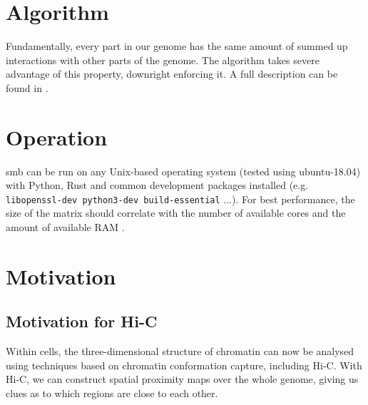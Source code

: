 


\section{Algorithm}\label{sec:algorithm}


Fundamentally, every part in our genome has the same amount of summed up
interactions with other parts of the genome. The algorithm takes severe
advantage of this property, downright enforcing it. A full description can be
found in .


\section{Operation}\label{sec:operation}

smb can be run on any Unix-based operating system (tested using ubuntu-18.04)
with Python, Rust and common development packages installed (e.g.
\verb!libopenssl-dev python3-dev build-essential! ...). For best performance, the
size of the matrix should correlate with the number of available cores and the
amount of available RAM .



\section{Motivation}\label{sec:motivation}

\subsection{Motivation for Hi-C}

Within cells, the three-dimensional structure of chromatin can now be analysed
using techniques based on chromatin conformation capture, including Hi-C. With
Hi-C, we can construct spatial proximity maps over the whole genome, giving us
clues as to which regions are close to each other.


